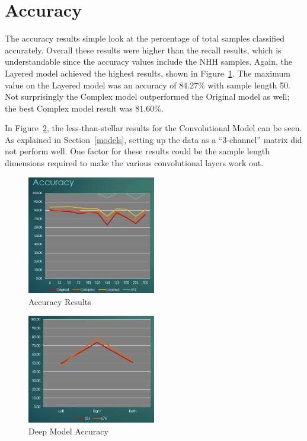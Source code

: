 \documentclass[]{report}
\begin{document}
\section{Accuracy}

The accuracy results simple look at the percentage of total samples classified accurately. Overall these results were higher than the recall results, which is understandable since the accuracy values include the NHH samples. Again, the Layered model achieved the highest results, shown in Figure~\ref{accuracy}. The maximum value on the Layered model was an accuracy of 84.27\% with sample length 50. Not surprisingly the Complex model outperformed the Original model as well; the best Complex model result was 81.60\%.

In Figure~\ref{acuracy-deep}, the less-than-stellar results for the Convolutional Model can be seen. As explained in Section~\ref{models}, setting up the data as a ``3-channel'' matrix did not perform well. One factor for these results could be the sample length dimensions required to make the various convolutional layers work out. 

\begin{figure}
	\centering
	\includegraphics[width=0.5\textwidth]{../images/accuracy}
	\caption{Accuracy Results}
	\label{accuracy}
\end{figure}
\begin{figure}
	\centering
	\includegraphics[width=0.5\textwidth]{../images/accuracy-deep}
	\caption{Deep Model Accuracy}
	\label{acuracy-deep}
\end{figure}
\end{document}
